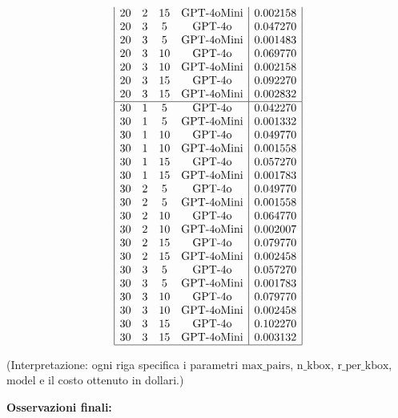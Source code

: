 \documentclass[a4paper,12pt]{article}
\begin{document}
{\[\begin{array}{|cccc|c|}
20 & 2 & 15 & \text{GPT-4oMini}& 0.002158\\
20 & 3 & 5 & \text{GPT-4o}     & 0.047270\\
20 & 3 & 5 & \text{GPT-4oMini} & 0.001483\\
20 & 3 & 10 & \text{GPT-4o}    & 0.069770\\
20 & 3 & 10 & \text{GPT-4oMini}& 0.002158\\
20 & 3 & 15 & \text{GPT-4o}    & 0.092270\\
20 & 3 & 15 & \text{GPT-4oMini}& 0.002832\\
\hline
30 & 1 & 5 & \text{GPT-4o}     & 0.042270\\
30 & 1 & 5 & \text{GPT-4oMini} & 0.001332\\
30 & 1 & 10 & \text{GPT-4o}    & 0.049770\\
30 & 1 & 10 & \text{GPT-4oMini}& 0.001558\\
30 & 1 & 15 & \text{GPT-4o}    & 0.057270\\
30 & 1 & 15 & \text{GPT-4oMini}& 0.001783\\
30 & 2 & 5 & \text{GPT-4o}     & 0.049770\\
30 & 2 & 5 & \text{GPT-4oMini} & 0.001558\\
30 & 2 & 10 & \text{GPT-4o}    & 0.064770\\
30 & 2 & 10 & \text{GPT-4oMini}& 0.002007\\
30 & 2 & 15 & \text{GPT-4o}    & 0.079770\\
30 & 2 & 15 & \text{GPT-4oMini}& 0.002458\\
30 & 3 & 5 & \text{GPT-4o}     & 0.057270\\
30 & 3 & 5 & \text{GPT-4oMini} & 0.001783\\
30 & 3 & 10 & \text{GPT-4o}    & 0.079770\\
30 & 3 & 10 & \text{GPT-4oMini}& 0.002458\\
30 & 3 & 15 & \text{GPT-4o}    & 0.102270\\
30 & 3 & 15 & \text{GPT-4oMini}& 0.003132\\
\hline
\end{array}
\]

}

\medskip

\noindent
(Interpretazione: ogni riga specifica i parametri \(\text{max\_pairs}\), \(\text{n\_kbox}\), \(\text{r\_per\_kbox}\), \(\text{model}\) e il costo ottenuto in dollari.)

\bigskip

\textbf{Osservazioni finali:}
\end{document}
